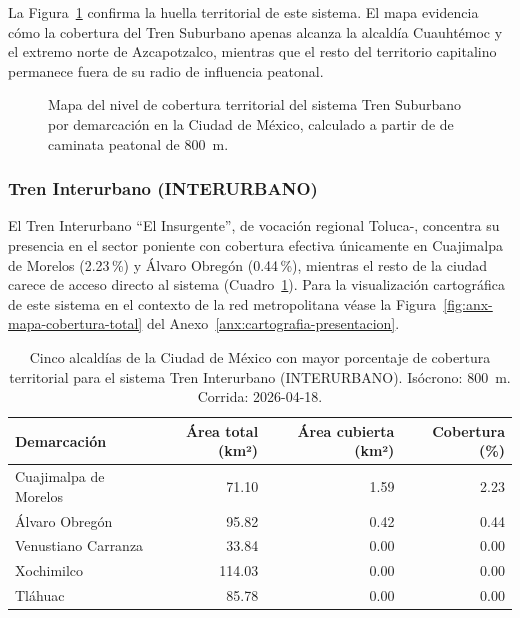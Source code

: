 La Figura~\ref{fig:mapa-cobertura-sub} confirma la huella territorial de este
sistema. El mapa evidencia cómo la cobertura del Tren Suburbano apenas alcanza la
alcaldía Cuauhtémoc y el extremo norte de Azcapotzalco, mientras que el resto del
territorio capitalino permanece fuera de su radio de influencia peatonal.

\begin{figure}[H]
    \centering
    \caption[Mapa de cobertura territorial del Tren Suburbano en la CDMX]{Mapa
    del nivel de cobertura territorial del sistema Tren Suburbano por demarcación
    en la Ciudad de México, calculado a partir de  de caminata
    peatonal de 800~m.}
    \label{fig:mapa-cobertura-sub}
\end{figure}

\subsubsection{Tren Interurbano (INTERURBANO)}
\label{subsubsec:cobertura-interurbano}

El Tren Interurbano ``El Insurgente'', de vocación regional Toluca-\cdmx{},
concentra su presencia en el sector poniente con cobertura efectiva únicamente en
Cuajimalpa de Morelos (2.23\,\%) y Álvaro Obregón (0.44\,\%), mientras el resto
de la ciudad carece de acceso directo al sistema
(Cuadro~\ref{tab:cobertura-interurbano-cdmx}). Para la visualización cartográfica
de este sistema en el contexto de la red metropolitana véase la
Figura~\ref{fig:anx-mapa-cobertura-total} del
Anexo~\ref{anx:cartografia-presentacion}.

\begin{table}[H]
    \centering
    \caption[Alcaldías con mayor cobertura de Tren Interurbano (CDMX)]{
    Cinco alcaldías de la Ciudad de México con mayor porcentaje de cobertura
    territorial para el sistema Tren Interurbano (INTERURBANO). Isócrono: 800~m.
    Corrida: 2026-04-18.}
    \label{tab:cobertura-interurbano-cdmx}
    \begin{tabular}{|l|r|r|r|}
        \hline
        \textbf{Demarcación} & \textbf{Área total (km²)} & \textbf{Área cubierta (km²)} & \textbf{Cobertura (\%)} \\
        \hline
        Cuajimalpa de Morelos &  71.10 & 1.59 & 2.23 \\
        Álvaro Obregón        &  95.82 & 0.42 & 0.44 \\
        Venustiano Carranza   &  33.84 & 0.00 & 0.00 \\
        Xochimilco            & 114.03 & 0.00 & 0.00 \\
        Tláhuac               &  85.78 & 0.00 & 0.00 \\
        \hline
    \end{tabular}
\end{table}

